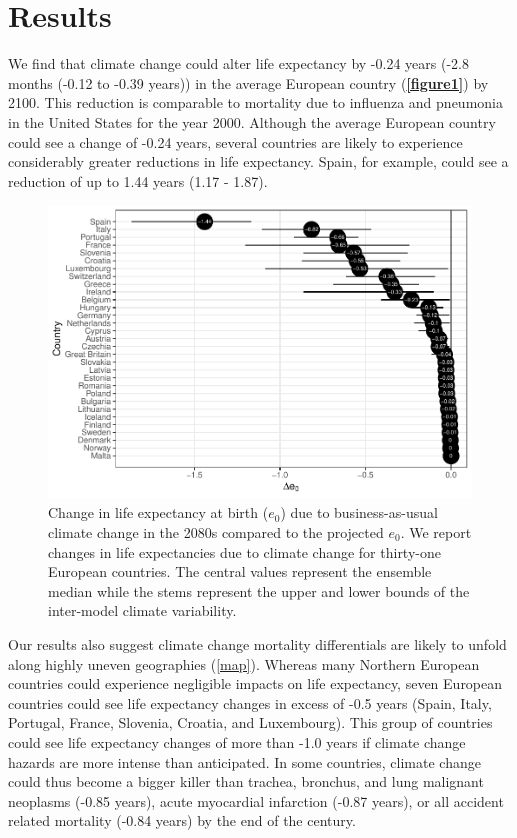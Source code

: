 \documentclass[12pt]{article}
\begin{document}
\hypertarget{results}{%
\section{Results}\label{results}}

We find that climate change could alter life expectancy by -0.24 years
(-2.8 months (-0.12 to -0.39 years)) in the average European country
(\textbf{\autoref{figure1}}) by 2100. This reduction is comparable to
mortality due to influenza and pneumonia \citep{arias2013united} in the
United States for the year 2000. Although the average European country
could see a change of -0.24 years, several countries are likely to
experience considerably greater reductions in life expectancy. Spain,
for example, could see a reduction of up to 1.44 years (1.17 - 1.87).

\begin{figure}
\centering
\includegraphics{MANUSCRIPT_files/figure-latex/figure-lollipop-1.pdf}
\caption{Change in life expectancy at birth (\(e_0\)) due to
business-as-usual climate change in the 2080s compared to the projected
\(e_0\). We report changes in life expectancies due to climate change
for thirty-one European countries. The central values represent the
ensemble median while the stems represent the upper and lower bounds of
the inter-model climate variability.\label{figure1}}
\end{figure}

Our results also suggest climate change mortality differentials are
likely to unfold along highly uneven geographies (\autoref{map}).
Whereas many Northern European countries could experience negligible
impacts on life expectancy, seven European countries could see life
expectancy changes in excess of -0.5 years (Spain, Italy, Portugal,
France, Slovenia, Croatia, and Luxembourg). This group of countries
could see life expectancy changes of more than -1.0 years if climate
change hazards are more intense than anticipated. In some countries,
climate change could thus become a bigger killer than trachea, bronchus,
and lung malignant neoplasms (-0.85 years), acute myocardial infarction
(-0.87 years), or all accident related mortality (-0.84 years)
\citep{arias2013united} by the end of the century.
\end{document}
